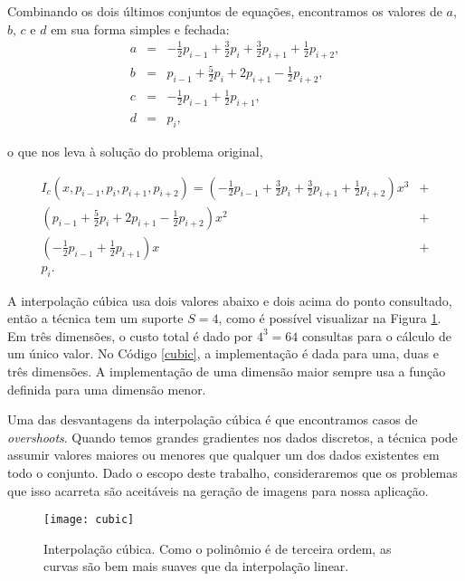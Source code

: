 Combinando os dois últimos conjuntos de equações, encontramos os valores de $a$, $b$, $c$ e $d$ em sua forma simples e fechada:
\[
\begin{array}{rcl}
a & = & -\frac{1}{2}p_{i-1} +\frac{3}{2}p_{i} +\frac{3}{2}p_{i+1} +\frac{1}{2}p_{i+2}, \\
b & = & p_{i-1} +\frac{5}{2}p_{i} + 2p_{i+1} -\frac{1}{2}p_{i+2}, \\
c & = & -\frac{1}{2}p_{i-1} + \frac{1}{2}p_{i+1}, \\
d & = & p_{i},
\end{array} 
\]

o que nos leva à solução do problema original,


\begin{align*}
 I_{c} (x, p_{i-1}, p_{i}, p_{i+1}, p_{i+2}) = \left( -\frac{1}{2}p_{i-1} +\frac{3}{2}p_{i} +\frac{3}{2}p_{i+1} +\frac{1}{2}p_{i+2} \right)x^3 &+ \\
 \left( p_{i-1} +\frac{5}{2}p_{i} + 2p_{i+1} -\frac{1}{2}p_{i+2} \right)x^2 &+ \\ \left( -\frac{1}{2}p_{i-1} + \frac{1}{2}p_{i+1} \right)x &+ \\ p_{i}.
 \end{align*}

A interpolação cúbica usa dois valores abaixo e dois acima do ponto consultado, então a técnica tem um suporte $S = 4$, como é possível visualizar na Figura \ref{cubicInterp}. Em três dimensões, o custo total é dado por $4^3 = 64$ consultas para o cálculo de um único valor. No Código \ref{cubic}, a implementação é dada para uma, duas e três dimensões. A implementação de uma dimensão maior sempre usa a função definida para uma dimensão menor.

Uma das desvantagens da interpolação cúbica é que encontramos casos de {\it overshoots}. Quando temos grandes gradientes nos dados discretos, a técnica pode assumir valores maiores ou menores que qualquer um dos dados existentes em todo o conjunto. Dado o escopo deste trabalho, consideraremos que os problemas que isso acarreta são aceitáveis na geração de imagens para nossa aplicação.

\begin{figure}[!htb]
\center
\texttt{[image: cubic]}
\caption{Interpolação cúbica. Como o polinômio é de terceira ordem, as curvas são bem mais suaves que da interpolação linear.}
\label{cubicInterp}
\end{figure}

\begin{figure}[!htb]

\end{figure}


